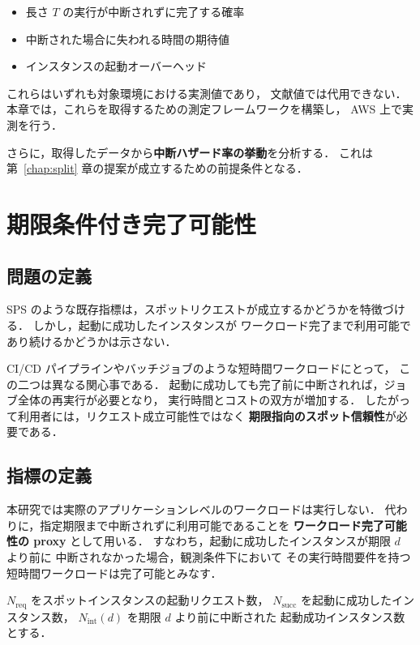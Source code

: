 \documentclass[11pt,a4paper]{ltjsreport}
\newcommand{\Nreq}{N_{\mathrm{req}}}
\newcommand{\Nsucc}{N_{\mathrm{succ}}}
\newcommand{\Nint}{N_{\mathrm{int}}}
\begin{document}
\begin{itemize}
  \item 長さ $T$ の実行が中断されずに完了する確率
  \item 中断された場合に失われる時間の期待値
  \item インスタンスの起動オーバーヘッド
\end{itemize}

これらはいずれも対象環境における実測値であり，
文献値では代用できない．
本章では，これらを取得するための測定フレームワークを構築し，
AWS 上で実測を行う．

さらに，取得したデータから\textbf{中断ハザード率の挙動}を分析する．
これは第~\ref{chap:split} 章の提案が成立するための前提条件となる．

\section{期限条件付き完了可能性}

\subsection{問題の定義}

SPS のような既存指標は，スポットリクエストが成立するかどうかを特徴づける．
しかし，起動に成功したインスタンスが
ワークロード完了まで利用可能であり続けるかどうかは示さない．

CI/CD パイプラインやバッチジョブのような短時間ワークロードにとって，
この二つは異なる関心事である．
起動に成功しても完了前に中断されれば，ジョブ全体の再実行が必要となり，
実行時間とコストの双方が増加する．
したがって利用者には，リクエスト成立可能性ではなく
\textbf{期限指向のスポット信頼性}が必要である．

\subsection{指標の定義}

本研究では実際のアプリケーションレベルのワークロードは実行しない．
代わりに，指定期限まで中断されずに利用可能であることを
\textbf{ワークロード完了可能性の proxy} として用いる．
すなわち，起動に成功したインスタンスが期限 $d$ より前に
中断されなかった場合，観測条件下において
その実行時間要件を持つ短時間ワークロードは完了可能とみなす．

$\Nreq$ をスポットインスタンスの起動リクエスト数，
$\Nsucc$ を起動に成功したインスタンス数，
$\Nint(d)$ を期限 $d$ より前に中断された
起動成功インスタンス数とする．
\end{document}
